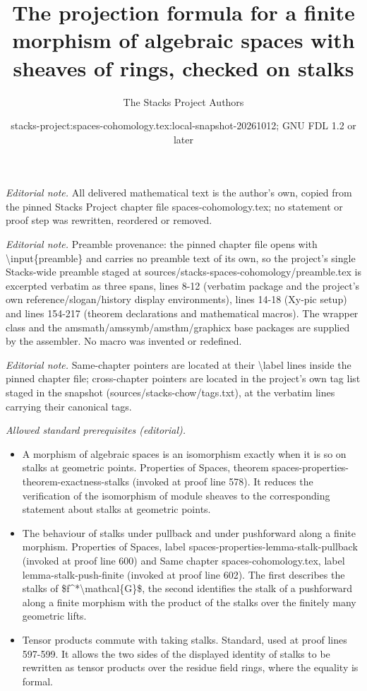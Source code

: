 \documentclass[10pt,a4paper]{amsart}
\title{The projection formula for a finite morphism of algebraic spaces with sheaves of rings, checked on stalks}
\author{The Stacks Project Authors}
\date{stacks-project:spaces-cohomology.tex:local-snapshot-20261012; GNU FDL 1.2 or later}
\theoremstyle{plain}
\theoremstyle{definition}
\theoremstyle{remark}
\numberwithin{equation}{subsection}
\begin{document}
\maketitle
\noindent\textit{Editorial note.} All delivered mathematical text is the author's own, copied from the pinned Stacks Project chapter file spaces-cohomology.tex; no statement or proof step was rewritten, reordered or removed.\par\medskip
\noindent\textit{Editorial note.} Preamble provenance: the pinned chapter file opens with \textbackslash{}input\{preamble\} and carries no preamble text of its own, so the project's single Stacks-wide preamble staged at sources/stacks-spaces-cohomology/preamble.tex is excerpted verbatim as three spans, lines 8-12 (verbatim package and the project's own reference/slogan/history display environments), lines 14-18 (Xy-pic setup) and lines 154-217 (theorem declarations and mathematical macros). The wrapper class and the amsmath/amssymb/amsthm/graphicx base packages are supplied by the assembler. No macro was invented or redefined.\par\medskip
\noindent\textit{Editorial note.} Same-chapter pointers are located at their \textbackslash{}label lines inside the pinned chapter file; cross-chapter pointers are located in the project's own tag list staged in the snapshot (sources/stacks-chow/tags.txt), at the verbatim lines carrying their canonical tags.\par\medskip
\noindent\textit{Allowed standard prerequisites (editorial).}\begin{itemize}
\item A morphism of algebraic spaces is an isomorphism exactly when it is so on stalks at geometric points. Properties of Spaces, theorem spaces-properties-theorem-exactness-stalks (invoked at proof line 578). It reduces the verification of the isomorphism of module sheaves to the corresponding statement about stalks at geometric points.
\item The behaviour of stalks under pullback and under pushforward along a finite morphism. Properties of Spaces, label spaces-properties-lemma-stalk-pullback (invoked at proof line 600) and Same chapter spaces-cohomology.tex, label lemma-stalk-push-finite (invoked at proof line 602). The first describes the stalks of \$f\textasciicircum{}*\textbackslash{}mathcal\{G\}\$, the second identifies the stalk of a pushforward along a finite morphism with the product of the stalks over the finitely many geometric lifts.
\item Tensor products commute with taking stalks. Standard, used at proof lines 597-599. It allows the two sides of the displayed identity of stalks to be rewritten as tensor products over the residue field rings, where the equality is formal.
\end{itemize}\medskip
\end{document}
